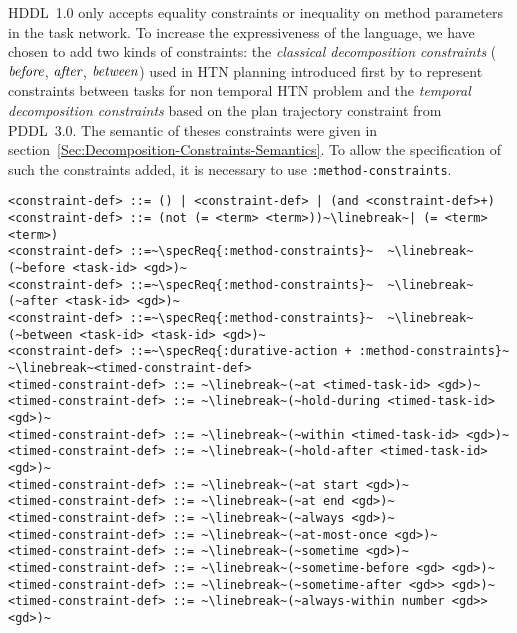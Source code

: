 \documentclass[letterpaper]{article} %
\newcommand{\before}{\text{\it before}}
\newcommand{\after}{\text{\it after}}
\renewcommand{\between}{\text{\it between}}
\begin{document}
%
%
HDDL~1.0 only accepts equality constraints or inequality on method parameters in the task network. To increase the expressiveness of the language, we have chosen to add two kinds of constraints: the {\em classical decomposition constraints} ($\before$, $\after$, $\between$) used in HTN planning introduced first by \citep{erol94} to represent constraints between tasks for non temporal HTN problem and the {\em temporal decomposition constraints} based on the plan trajectory constraint from PDDL~3.0. The semantic of theses constraints were given in section~\ref{Sec:Decomposition-Constraints-Semantics}. To allow the specification of such the constraints added, it is necessary to use \verb+:method-constraints+.

\begin{lstlisting}[firstnumber=last, escapechar=~]
<constraint-def> ::= () | <constraint-def> | (and <constraint-def>+)
<constraint-def> ::= (not (= <term> <term>))~\linebreak~| (= <term> <term>)
<constraint-def> ::=~\specReq{:method-constraints}~  ~\linebreak~(~before <task-id> <gd>)~
<constraint-def> ::=~\specReq{:method-constraints}~  ~\linebreak~(~after <task-id> <gd>)~
<constraint-def> ::=~\specReq{:method-constraints}~  ~\linebreak~(~between <task-id> <task-id> <gd>)~
<constraint-def> ::=~\specReq{:durative-action + :method-constraints}~ ~\linebreak~<timed-constraint-def>
<timed-constraint-def> ::= ~\linebreak~(~at <timed-task-id> <gd>)~
<timed-constraint-def> ::= ~\linebreak~(~hold-during <timed-task-id> <gd>)~
<timed-constraint-def> ::= ~\linebreak~(~within <timed-task-id> <gd>)~
<timed-constraint-def> ::= ~\linebreak~(~hold-after <timed-task-id> <gd>)~
<timed-constraint-def> ::= ~\linebreak~(~at start <gd>)~
<timed-constraint-def> ::= ~\linebreak~(~at end <gd>)~
<timed-constraint-def> ::= ~\linebreak~(~always <gd>)~
<timed-constraint-def> ::= ~\linebreak~(~at-most-once <gd>)~
<timed-constraint-def> ::= ~\linebreak~(~sometime <gd>)~
<timed-constraint-def> ::= ~\linebreak~(~sometime-before <gd> <gd>)~
<timed-constraint-def> ::= ~\linebreak~(~sometime-after <gd>> <gd>)~
<timed-constraint-def> ::= ~\linebreak~(~always-within number <gd>> <gd>)~
\end{lstlisting}
\end{document}
